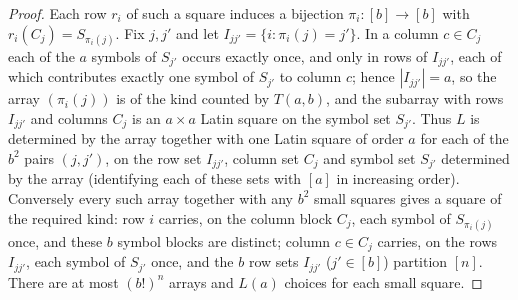 \documentclass[11pt]{amsart}
\theoremstyle{plain}
\theoremstyle{remark}
\begin{document}
\begin{proof}
Each row $r_i$ of such a square induces a bijection $\pi_i\colon[b]\to[b]$
with $r_i(C_j)=S_{\pi_i(j)}$.  Fix $j,j'$ and let
$I_{jj'}=\{i:\pi_i(j)=j'\}$.  In a column $c\in C_j$ each of the $a$
symbols of $S_{j'}$ occurs exactly once, and only in rows of $I_{jj'}$,
each of which contributes exactly one symbol of $S_{j'}$ to column $c$;
hence $|I_{jj'}|=a$, so the array $(\pi_i(j))$ is of the kind counted by
$T(a,b)$, and the subarray with rows $I_{jj'}$ and columns $C_j$ is an
$a\times a$ Latin square on the symbol set $S_{j'}$.  Thus $L$ is
determined by the array together with one Latin square of order $a$ for
each of the $b^2$ pairs $(j,j')$, on the row set $I_{jj'}$, column set
$C_j$ and symbol set $S_{j'}$ determined by the array (identifying each
of these sets with $[a]$ in increasing order).  Conversely every such
array together with any $b^2$ small squares gives a square of the
required kind: row $i$ carries, on the column block $C_j$, each symbol
of $S_{\pi_i(j)}$ once, and these $b$ symbol blocks are distinct; column
$c\in C_j$ carries, on the rows $I_{jj'}$, each symbol of $S_{j'}$ once,
and the $b$ row sets $I_{jj'}$ ($j'\in[b]$) partition $[n]$.  There are
at most $(b!)^n$ arrays and $L(a)$ choices for each small square.
\end{proof}
\end{document}
